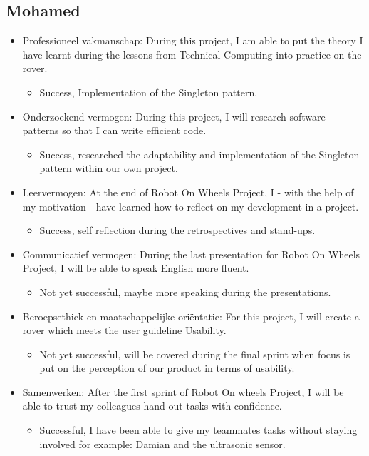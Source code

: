 \documentclass[12pt]{article}
\begin{document}
	\subsection{Mohamed}
	\begin{itemize}
		\item Professioneel vakmanschap: During this project, I am able to put the theory I have learnt during the lessons from Technical Computing into practice on the rover.
		\begin{itemize}
			\item Success, Implementation of the Singleton pattern.
		\end{itemize}
		\item Onderzoekend vermogen: During this project, I will research software patterns so that I can write efficient code.
		\begin{itemize}
			\item Success, researched the adaptability and implementation of the Singleton pattern within our own project. 
		\end{itemize}
		\item Leervermogen: At the end of Robot On Wheels Project, I - with the help of my motivation - have learned how to reflect on my development in a project.
		\begin{itemize}
			\item Success, self reflection during the retrospectives and stand-ups.
		\end{itemize}
		\item Communicatief vermogen: During the last presentation for Robot On Wheels Project, I will be able to speak English more fluent.
		\begin{itemize}
			\item Not yet successful, maybe more speaking during the presentations.
		\end{itemize}
		\item Beroepsethiek en maatschappelijke oriëntatie: For this project, I will create a rover which meets the user guideline Usability.
		\begin{itemize}
			\item Not yet successful, will be covered during the final sprint when focus is put on the perception of our product in terms of usability.
		\end{itemize}
		\item Samenwerken: After the first sprint of Robot On wheels Project, I will be able to trust my colleagues hand out tasks with confidence.
		\begin{itemize}
			\item Successful, I have been able to give my teammates tasks without staying involved for example: Damian and the ultrasonic sensor.
		\end{itemize}
	\end{itemize}
\end{document}
